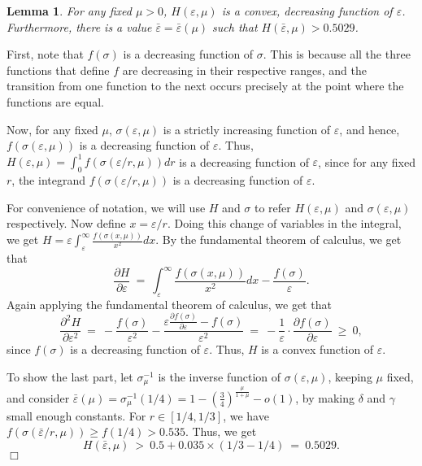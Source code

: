 \documentclass[11pt]{article}
\newtheorem{Lem}[theorem]{Lemma}
\newenvironment{myproof}{\noindent {\sc Proof:}}{$\Box$}
\def\epsilon{\varepsilon}
\newcommand\soto{f\xspace}
\begin{document}
\begin{Lem} \label{lem:H-properties}
For any fixed $\mu > 0$, $H(\epsilon, \mu)$ is a convex, decreasing function of
$\epsilon$. Furthermore, there is a value $\bar{\epsilon} =
\bar{\epsilon}(\mu)$ such that $H(\bar{\epsilon}, \mu) > 0.5029$.
\end{Lem}
\begin{myproof}
First, note that $\soto(\sigma)$ is a decreasing function of $\sigma$. This is
because all the three functions that define $\soto$ are decreasing in their
respective ranges, and the transition from one function to the next occurs
precisely at the point where the functions are equal.

Now, for any fixed $\mu$, $\sigma(\epsilon, \mu)$ is a strictly increasing
function of $\epsilon$, and hence, $\soto(\sigma(\epsilon, \mu))$ is a
decreasing function of $\epsilon$. Thus, $H(\epsilon, \mu) = \int_0^1
\soto(\sigma(\epsilon/r, \mu))dr$ is a decreasing function of $\epsilon$, since
for any fixed $r$, the integrand $\soto(\sigma(\epsilon/r, \mu))$ is a
decreasing function of $\epsilon$.

For convenience of notation, we will use $H$ and $\sigma$ to refer $H(\epsilon,
\mu)$ and $\sigma(\epsilon, \mu)$ respectively. Now define $x = \epsilon/r$.
Doing this change of variables in the integral, we get $H = \epsilon
\int_\epsilon^\infty \frac{\soto(\sigma(x, \mu))}{x^2} dx$. By the fundamental
theorem of calculus, we get that
$$\frac{\partial H}{\partial \epsilon}\ =\ \int_\epsilon^\infty \frac{\soto(\sigma(x, \mu))}{x^2} dx - \frac{\soto(\sigma)}{\epsilon}.$$
Again applying the fundamental theorem of calculus, we get that
$$\frac{\partial^2 H}{\partial \epsilon^2}\ =\
-\frac{\soto(\sigma)}{\epsilon^2} - \frac{\epsilon\frac{\partial
\soto(\sigma)}{\partial \epsilon} - \soto(\sigma)}{\epsilon^2}\ =\
-\frac{1}{\epsilon}\cdot\frac{\partial \soto(\sigma)}{\partial \epsilon}\ \geq\
0,$$ since $\soto(\sigma)$ is a decreasing function of $\epsilon$. Thus, $H$ is a convex
function of $\epsilon$.

To show the last part, let $\sigma^{-1}_\mu$ is the inverse function of
$\sigma(\epsilon, \mu)$, keeping $\mu$ fixed, and consider $\bar{\epsilon}(\mu)
= \sigma^{-1}_{\mu}(1/4) = 1 - (\frac{3}{4})^{\frac{\mu}{1+\mu}} - o(1)$, by
making $\delta$ and $\gamma$ small enough constants. For $r \in [1/4, 1/3]$, we
have $\soto(\sigma(\bar{\epsilon}/r, \mu)) \geq \soto(1/4)
> 0.535$. Thus, we get
$$H(\bar{\epsilon}, \mu)\ >\ 0.5 + 0.035 \times (1/3 - 1/4)\ =\ 0.5029.$$
\end{myproof}
\end{document}
